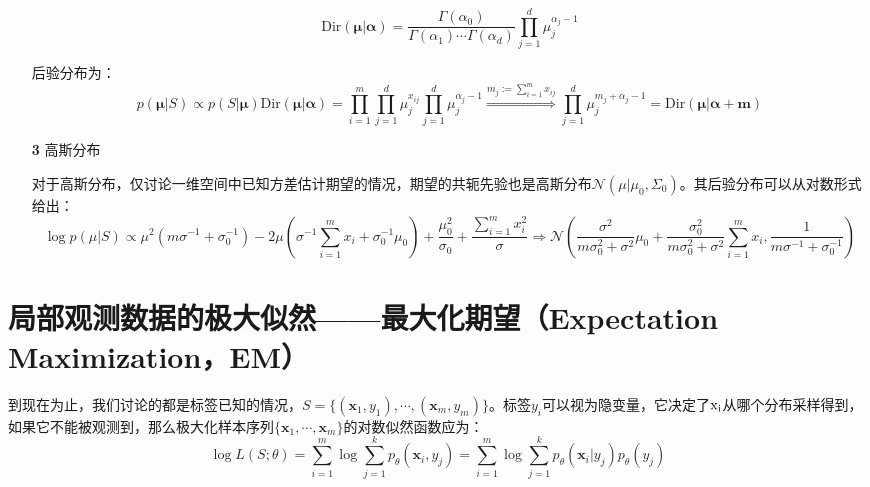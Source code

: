 \documentclass{article}
\begin{document}
\begin{itemize}
\begin{scriptsize}
\begin{spacing}{1.2}
{	\begin{equation*}
	\mathrm{Dir} (\bm{\mu}|\bm{\alpha}) = \frac{\Gamma(\alpha_0)}{\Gamma(\alpha_1)\cdots\Gamma(\alpha_d)}  \prod_{j=1}^d \mu_j^{\alpha_j-1}
	\end{equation*}
	
	后验分布为：
	\begin{equation*}
	p(\bm{\mu}|S) \propto p(S|\bm{\mu}) \mathrm{Dir} (\bm{\mu}|\bm{\alpha}) =\prod_{i=1}^m \prod_{j=1}^d \mu_j^{x_{ij}} \prod_{j=1}^d \mu_j^{\alpha_j-1} \overset{m_j:=\sum_{i=1}^m x_{ij}}{\Longrightarrow}  \prod_{j=1}^d \mu_j^{m_j+\alpha_j-1} = \mathrm{Dir} (\bm{\mu}|\bm{\alpha}+\bm{m})
	\end{equation*}
	}
	\end{spacing}
	\end{scriptsize}
	\vspace{-2mm}
	
	\item [\textbf{3}] 高斯分布

	\vspace{1mm}
	\begin{scriptsize}
	\begin{spacing}{1.2}
	{\sffamily
	对于高斯分布，仅讨论一维空间中已知方差估计期望的情况，期望的共轭先验也是高斯分布$\mathcal{N}(\mu|\mu_0, \Sigma_0)$。其后验分布可以从对数形式给出：
	\begin{equation*}
	\log p(\mu|S) \propto \mu^2 (m \sigma^{-1} + \sigma_0^{-1}) - 2 \mu \left(\sigma^{-1} \sum_{i=1}^m x_i + \sigma_0^{-1} \mu_0\right) + \frac{\mu_0^2}{\sigma_0} + \frac{ \sum_{i=1}^mx_i^2}{\sigma} 
	\Longrightarrow \mathcal{N}\left(\frac{\sigma^2}{m\sigma_0^2+\sigma^2}\mu_0 + \frac{\sigma_0^2}{m\sigma_0^2+\sigma^2}\sum_{i=1}^m x_i, \frac{1}{m \sigma^{-1} + \sigma_0^{-1}}\right)
	\end{equation*}

	}
	\end{spacing}
	\end{scriptsize}
	\vspace{-2mm}
	
	\end{itemize}
	
\section{局部观测数据的极大似然——最大化期望（Expectation Maximization，EM）}
	到现在为止，我们讨论的都是标签已知的情况，$S=\{(\bm{x}_1,y_1),\cdots,(\bm{x}_m,y_m)\}$。标签$y_i$可以视为隐变量，它决定了$\rm{x}_i$从哪个分布采样得到，如果它不能被观测到，那么极大化样本序列$\{\bm{x}_1,\cdots,\bm{x}_m\}$的对数似然函数应为：
	\begin{equation}
	\log L(S;\theta) = \sum_{i=1}^m \log \sum_{j=1}^k p_\theta(\bm{x}_i,y_j) = \sum_{i=1}^m \log \sum_{j=1}^k p_\theta(\bm{x}_i|y_j)p_\theta(y_j)
	\end{equation}
	
\end{document}
